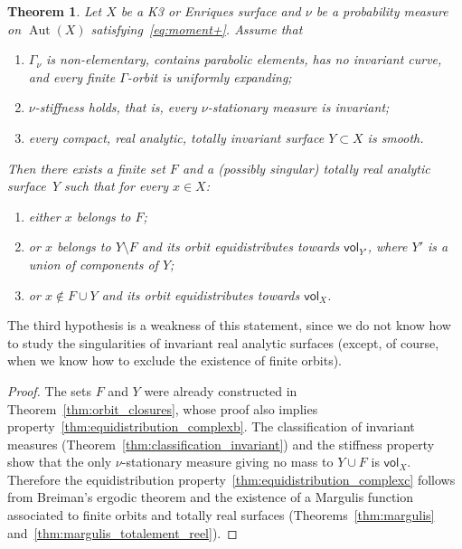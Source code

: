 \documentclass[11pt]{article}
\newenvironment{enumeratea}
{\bgroup\def\theenumi{\alph{enumi}}\begin{enumerate}}
{\end{enumerate}\egroup}
\DeclareMathOperator{\aut}{Aut}
\newcommand{\vol}{{\mathsf{vol}}}
\theoremstyle{plain}
\newtheorem{thm}{Theorem}[section]
\theoremstyle{definition}
\numberwithin{equation}{section}
\begin{document}
\begin{thm}\label{thm:equidistribution_complex}
Let $X$ be a K3 or Enriques surface and $\nu$ be a probability
measure on $\aut(X)$ satisfying~\eqref{eq:moment+}.
Assume that
\begin{enumerate}
\item\label{thm:equidistribution_complex1} $\Gamma_\nu$ is non-elementary, contains parabolic elements, has no invariant curve,
and every finite $\Gamma$-orbit is uniformly expanding;
\item $\nu$-stiffness holds, that is, every $\nu$-stationary measure is invariant;
\item\label{thm:equidistribution_complex2} every compact, real analytic, totally invariant surface $Y\subset X$ is smooth.
\end{enumerate}
Then there exists a finite set $F$ and a (possibly singular) totally real analytic surface~$Y$ such that for every
$x\in X$:
\begin{enumeratea}
\item\label{thm:equidistribution_complexa} either $x$ belongs to $F$;
\item\label{thm:equidistribution_complexb} or $x$ belongs to $Y\setminus F$ and its orbit equidistributes towards $\vol_{Y'}$, where $Y'$ is a union of components of $Y$;
\item\label{thm:equidistribution_complexc} or $x\notin F\cup Y$ and its orbit equidistributes towards $\vol_{X}$.
\end{enumeratea}
\end{thm}

The third hypothesis is a weakness of this statement, since we do not know how to study the singularities of invariant real analytic surfaces (except, of course, when we know how to exclude the existence of finite orbits).

\begin{proof}
The sets $F$ and $Y$ were already constructed in Theorem~\ref{thm:orbit_closures}, whose proof
also implies property~\eqref{thm:equidistribution_complexb}.
The classification of invariant measures (Theorem~\ref{thm:classification_invariant}) and the
stiffness property show that the only $\nu$-stationary measure giving no mass to
$Y\cup F$ is $\vol_X$. Therefore the equidistribution property~\eqref{thm:equidistribution_complexc} follows from Breiman's ergodic theorem
and the existence of a Margulis function associated to finite orbits and totally real surfaces (Theorems~\ref{thm:margulis} and~\ref{thm:margulis_totalement_reel}).
\end{proof}
\end{document}
